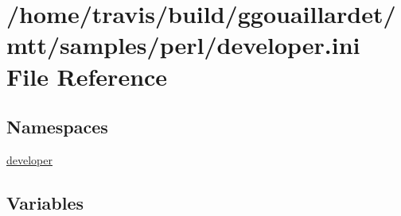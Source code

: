 \hypertarget{developer_8ini}{\section{/home/travis/build/ggouaillardet/mtt/samples/perl/developer.ini File Reference}
\label{developer_8ini}
}
\subsection*{Namespaces}
\begin{DoxyCompactItemize}
\item 
\hyperlink{namespacedeveloper}{developer}
\end{DoxyCompactItemize}
\subsection*{Variables}
